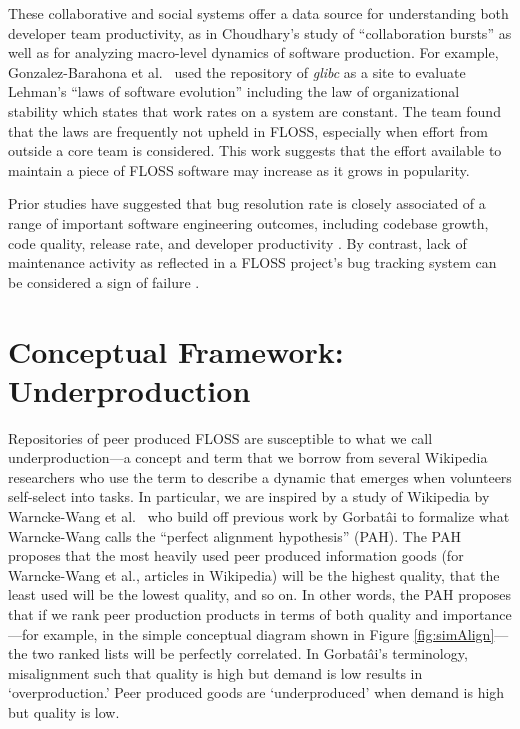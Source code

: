 \documentclass[10pt,conference]{IEEEtran}\usepackage[]{graphicx}\usepackage[usenames,dvipsnames]{color}
\begin{document}
These collaborative and social systems offer a data source for understanding both developer team productivity, as in Choudhary's \cite{choudhary_using_2020} study of ``collaboration bursts'' as well as for analyzing macro-level dynamics of software production. For example, Gonzalez-Barahona et al.~\cite{gonzalez-barahona_studying_2014} used the repository of \textit{glibc} as a site to evaluate Lehman's ``laws of software evolution''  including the law of organizational stability which states that work rates on a system are constant. The team found that the laws are frequently not upheld in FLOSS, especially when effort from outside a core team is considered. This work suggests that the effort available to maintain a piece of FLOSS software may increase as it grows in popularity. 

Prior studies have suggested that bug resolution rate is closely associated of a range of important software engineering outcomes, including codebase growth, code quality, release rate, and developer productivity \cite{abou_khalil_longitudinal_2019, kim_how_2006, michlmayr_statistical_2006}. By contrast, lack of maintenance activity as reflected in a FLOSS project's bug tracking system can be considered a sign of failure \cite{coelho_why_2017}. 

\section{Conceptual Framework: Underproduction}
\label{sec:underprod}


Repositories of peer produced FLOSS are susceptible to what we call underproduction---a concept and term that we borrow from several Wikipedia researchers who use the term to describe a dynamic that emerges when volunteers self-select into tasks. 
In particular, we are inspired by a study of Wikipedia by Warncke-Wang et al.~\cite{warncke-wang_misalignment_2015} who build off previous work by Gorbatâi \cite{gorbatai_exploring_2011} to formalize what Warncke-Wang calls the ``perfect alignment hypothesis'' (PAH). The PAH proposes that the most heavily used peer produced information goods (for Warncke-Wang et al., articles in Wikipedia) will be the highest quality, that the least used will be the lowest quality, and so on. 
In other words, the PAH proposes that if we rank peer production products in terms of both quality and importance---for example, in the simple conceptual diagram shown in Figure \ref{fig:simAlign}---the two ranked lists will be perfectly correlated.
In Gorbatâi's terminology, misalignment such that quality is high but demand is low results in `overproduction.'
Peer produced goods are `underproduced' when demand is high but quality is low.
\end{document}
